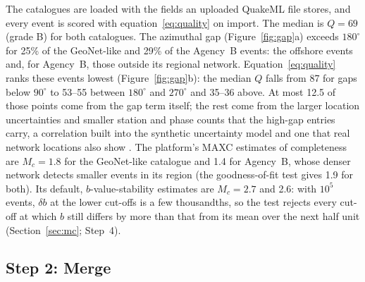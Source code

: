 \documentclass[12pt]{article}
\begin{document}
The catalogues are loaded with the fields an uploaded QuakeML file stores, and
every event is scored with equation~\eqref{eq:quality} on import.  The median is
$Q = 69$ (grade B) for both catalogues.  The azimuthal gap
(Figure~\ref{fig:gap}a) exceeds $180^{\circ}$ for 25\% of the GeoNet-like and 29\%
of the Agency~B events: the offshore events and, for Agency~B, those outside its
regional network.  Equation~\eqref{eq:quality} ranks these events lowest
(Figure~\ref{fig:gap}b): the median $Q$ falls from 87 for gaps below $90^{\circ}$
to 53--55 between $180^{\circ}$ and $270^{\circ}$ and 35--36 above.  At most 12.5
of those points come from the gap term itself; the rest come from the larger
location uncertainties and smaller station and phase counts that the high-gap
entries carry, a correlation built into the synthetic uncertainty model and one
that real network locations also show \citep{bondar2004}.  The platform's MAXC
estimates of completeness are $M_c = 1.8$ for the GeoNet-like catalogue and 1.4
for Agency~B, whose denser network detects smaller events in its region (the
goodness-of-fit test gives 1.9 for both).  Its default, $b$-value-stability
estimates are $M_c = 2.7$ and 2.6: with $10^5$ events, $\delta b$ at the lower
cut-offs is a few thousandths, so the test rejects every cut-off at which
$\hat{b}$ still differs by more than that from its mean over the next half unit
(Section~\ref{sec:mc}; Step~4).

\subsection{Step 2: Merge}
\end{document}
